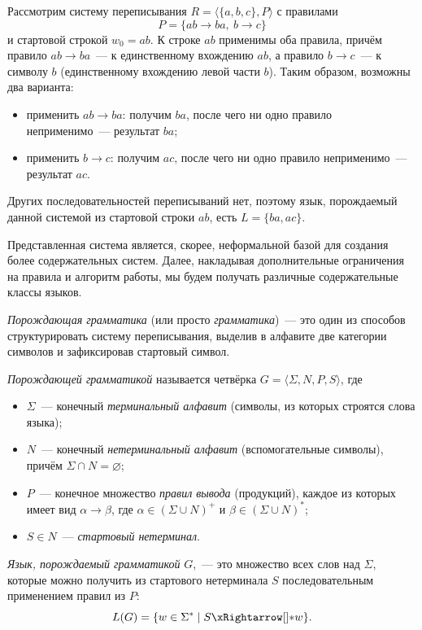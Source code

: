\begin{example}
    Рассмотрим систему переписывания $R = \langle \{a, b, c\}, P \rangle$ с правилами
    \[
        P = \{ab \to ba,\ b \to c\}
    \]
    и стартовой строкой $w_0 = ab$.
    К строке $ab$ применимы оба правила, причём правило $ab \to ba$~--- к единственному вхождению $ab$, а правило $b \to c$~--- к символу $b$ (единственному вхождению левой части $b$).
    Таким образом, возможны два варианта:
    \begin{itemize}
        \item применить $ab \to ba$: получим $ba$, после чего ни одно правило неприменимо~--- результат $ba$;
        \item применить $b \to c$: получим $ac$, после чего ни одно правило неприменимо~--- результат $ac$.
    \end{itemize}
    Других последовательностей переписываний нет, поэтому язык, порождаемый данной системой из стартовой строки $ab$, есть $L = \{ba, ac\}$.
\end{example}

Представленная система является, скорее, неформальной базой для создания более содержательных систем.
Далее, накладывая дополнительные ограничения на правила и алгоритм работы, мы будем получать различные содержательные классы языков.

\emph{Порождающая грамматика} (или просто \emph{грамматика})~--- это один из способов структурировать систему переписывания, выделив в алфавите две категории символов и зафиксировав стартовый символ.

\begin{definition}
    \label{def:GenerativeGrammar}
    \emph{Порождающей грамматикой} называется четвёрка $G = \langle \Sigma, N, P, S \rangle$, где
    \begin{itemize}
        \item $\Sigma$~--- конечный \emph{терминальный алфавит} (символы, из которых строятся слова языка);
        \item $N$~--- конечный \emph{нетерминальный алфавит} (вспомогательные символы), причём $\Sigma \cap N = \varnothing$;
        \item $P$~--- конечное множество \emph{правил вывода} (продукций), каждое из которых имеет вид $\alpha \to \beta$, где $\alpha \in (\Sigma \cup N)^+$ и $\beta \in (\Sigma \cup N)^*$;
        \item $S \in N$~--- \emph{стартовый нетерминал}.
    \end{itemize}
    \emph{Язык, порождаемый грамматикой} $G$,~--- это множество всех слов над $\Sigma$, которые можно получить из стартового нетерминала $S$ последовательным применением правил из $P$:
    \[
        L(G) = \{w \in \Sigma^* \mid S \derives w\}.
    \]
\end{definition}

